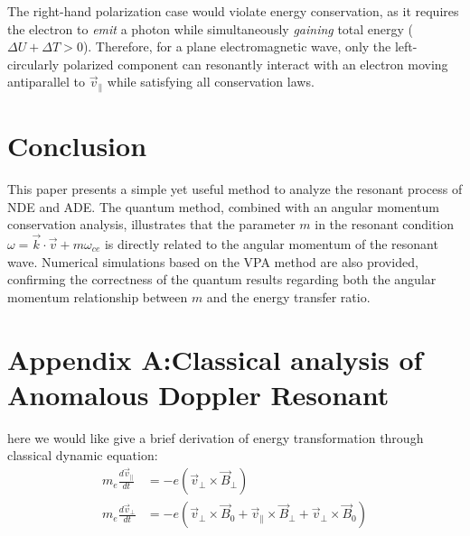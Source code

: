 \documentclass{cpbtex}
\begin{document}
\begin{CJK*}{GBK}{song}

The right-hand polarization case would violate energy conservation, as it requires the electron to \emph{emit} a photon while simultaneously \emph{gaining} total energy ($\Delta U + \Delta T > 0$). 
Therefore, for a plane electromagnetic wave, only the left-circularly polarized component can resonantly interact with an electron moving antiparallel to $\vec{v}_{\parallel}$ while satisfying all conservation laws.



\section{Conclusion}
This paper presents a simple yet useful method to analyze the resonant process of NDE and ADE. The quantum method, combined with an angular momentum conservation analysis, illustrates that the parameter $m$ in the resonant condition $\omega = \vec{k} \cdot \vec{v} + m\omega_{ce}$ is directly related to the angular momentum of the resonant wave. Numerical simulations based on the VPA method are also provided, confirming the correctness of the quantum results regarding both the angular momentum relationship between $m$ and the energy transfer ratio.

\section*{Appendix A:Classical analysis of Anomalous Doppler Resonant}
here we would like give a brief derivation of energy transformation through classical dynamic equation:
\begin{align}
m_e \frac{d\vec{v}_\parallel}{dt} &= -e(\vec{v}_\perp \times \vec{B}_\perp) \label{eq:19} \\
m_e \frac{d\vec{v}_\perp}{dt} &= -e(\vec{v}_\perp \times \vec{B}_0 + \vec{v}_\parallel \times \vec{B}_\perp + \vec{v}_\perp \times \vec{B}_0) \label{eq:20}
\end{align}


\end{CJK*}
\end{document}
